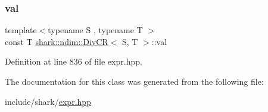 \subsubsection{\texorpdfstring{val}{val}}
{\footnotesize\ttfamily template$<$typename S , typename T $>$ \\
const T \hyperlink{classshark_1_1ndim_1_1_div_c_r}{shark\+::ndim\+::\+Div\+CR}$<$ S, T $>$\+::val\hspace{0.3cm}{\ttfamily [private]}}



Definition at line 836 of file expr.\+hpp.



The documentation for this class was generated from the following file\+:\begin{DoxyCompactItemize}
\item 
include/shark/\hyperlink{expr_8hpp}{expr.\+hpp}\end{DoxyCompactItemize}
